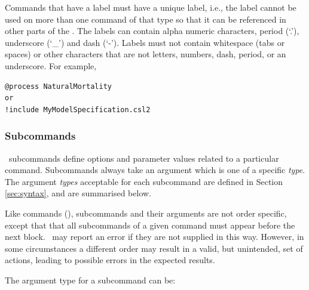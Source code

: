 Commands that have a label must have a unique label, i.e., the label cannot be used on more than one command of that type so that it can be referenced in other parts of the \config. The labels can contain alpha numeric characters, period (`.'), underscore (`\_') and dash (`-'). Labels must not contain whitespace (tabs or spaces) or other characters that are not letters, numbers, dash, period, or an underscore. For example,

{\small{\begin{verbatim}
@process NaturalMortality
or
!include MyModelSpecification.csl2
\end{verbatim}}}

\subsubsection{Subcommands}

\CNAME~subcommands define options and parameter values related to a particular command. Subcommands always take an argument which is one of a specific \emph{type}. The argument \emph{types} acceptable for each subcommand are defined in Section \ref{sec:syntax}, and are summarised below.

Like commands (), subcommands and their arguments are not order specific, except that that all subcommands of a given command must appear before the next  block. \CNAME~may report an error if they are not supplied in this way. However, in some circumstances a different order may result in a valid, but unintended, set of actions, leading to possible errors in the expected results.

The argument type for a subcommand can be:

